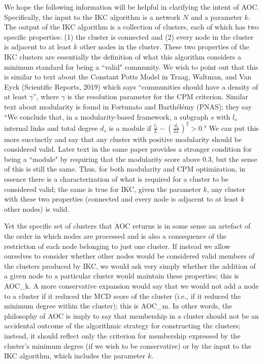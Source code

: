 \documentclass[11pt, oneside]{article}   	%
\begin{document}
\vspace{2 mm}  
We hope the following information will be helpful in clarifying the intent of AOC.  Specifically, the input to the IKC algorithm is a network $N$ and a parameter $k$. The output of the IKC algorithm is a collection of clusters, each of which has two specific properties: (1) the cluster is connected and (2) every node in the cluster is adjacent to at least $k$ other nodes in the cluster.  
These two properties of the IKC clusters are essentially the definition of what this algorithm considers  a minimum standard for being a ``valid" community.  
We wish to point out that this is similar to text about the Constant Potts Model in Traag, Waltman, and Van Eyck (Scientific Reports, 2019) 
which says ``communities should have a density of at least $\gamma$'', 
where $\gamma$ is the resolution parameter for the CPM criterion.  
Similar text about modularity is found in Fortunato and Barth\'el\'emy (PNAS); 
 they  say 
``We conclude that, in a modularity-based framework, a subgraph $s$ with $l_s$ internal links and total degree $d_s$ is a 
module if $\frac{l_s}{L} - 
\left( \frac{d_s}{2L} \right) ^2 > 0$."  
We can put this more succinctly and say that any cluster with positive modularity should be considered valid. 
Later text in the same paper provides a stronger condition for being a ``module" by requiring that the modularity score above 0.3, but the sense of this is still the same.
Thus, for both modularity and CPM optimization, in essence there is a characterization of what is required for a cluster to be considered valid; the same is true for IKC, given the parameter $k$, any cluster with these two properties (connected and every node is adjacent to at least $k$ other nodes) is valid.

Yet the specific set of clusters that AOC returns is in some sense an artefact of the order in which nodes are processed and is also a consequence of the restriction of each node belonging to just one cluster. If instead we allow ourselves to consider whether other nodes would be considered valid members of the clusters produced by IKC, we would ask very simply whether the addition of a given node to a particular cluster would maintain these properties; this is AOC\_k.  A more conservative expansion would say that we would not add a node to a cluster if it reduced the MCD score of the cluster (i.e., if it reduced the minimum degree within the cluster); this is AOC\_{m}. 
In other words, the philosophy of AOC is imply to say that membership in a cluster should not be an accidental outcome of the algorithmic strategy for constructing the clusters; instead, it should reflect only the criterion for membership expressed by the cluster's minimum degree (if we wish to be conservative) or by the input to the IKC algorithm, which includes the parameter $k$.
\end{document}
